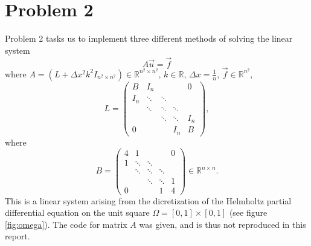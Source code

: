 \documentclass[12pt, a4paper,usenames,dvipsnames]{article}
\begin{document}
\section*{Problem 2}
Problem 2 tasks us to implement three different methods of solving the linear system
\[A\Vec{u}=\Vec{f}\]
where \(A=(L+\Delta x^2k^2I_{n^2\times n^2})\in \mathbb{R}^{n^2\times n^2}\), \(k\in\mathbb{R}\), \(\Delta x=\frac{1}{n}\), \(\Vec{f}\in\mathbb{R}^{n^2}\),
\[L=\left(\begin{array}{ccccc}
     B&I_n&&&0  \\
     I_n&\ddots&\ddots&&\\
     &\ddots&\ddots&\ddots&\\
     &&\ddots&\ddots&I_n\\
     0&&&I_n&B
\end{array}\right),\]
where 
\[B=\left(\begin{array}{ccccc}
     4&1&&&0  \\
     1&\ddots&\ddots&&\\
     &\ddots&\ddots&\ddots&\\
     &&\ddots&\ddots&1\\
     0&&&1&4
\end{array}\right)\in\mathbb{R}^{n\times n}.\]
This is a linear system arising from the dicretization of the Helmholtz partial differential equation on the unit square \(\Omega=[0,1]\times [0,1]\) (see figure \ref{fig:omega}). The code for matrix \(A\) was given, and is thus not reproduced in this report.
\end{document}

